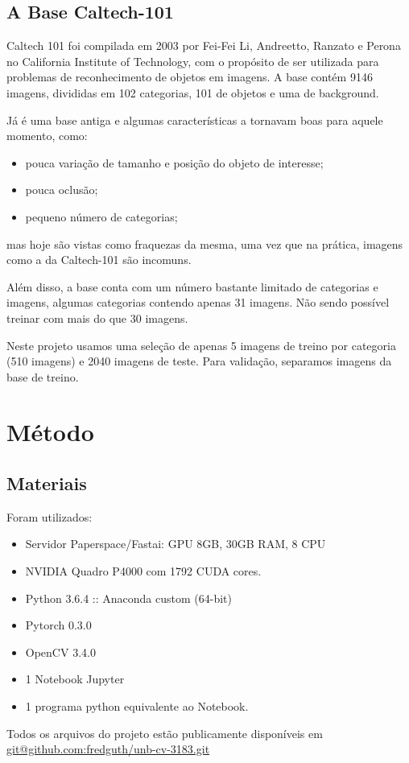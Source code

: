 \documentclass[conference]{IEEEtran}
\begin{document}
\subsection{A Base Caltech-101}
Caltech 101 foi compilada em 2003 por Fei-Fei Li, Andreetto, Ranzato e Perona no California Institute of Technology\cite{caltech101}, com o propósito de ser utilizada para problemas de reconhecimento de objetos em imagens. A base contém 9146 imagens, divididas em 102 categorias, 101 de objetos e uma de background. 

Já é uma base antiga e algumas características a tornavam boas para aquele momento, como:

\begin{itemize}
\item pouca variação de tamanho e posição do objeto de interesse;
\item pouca oclusão;
\item pequeno número de categorias;
\end{itemize}

mas hoje são vistas como fraquezas da mesma, uma vez que na prática, imagens como a da Caltech-101 são incomuns.

Além disso, a base conta com um número bastante limitado de categorias e imagens, algumas categorias contendo apenas 31 imagens. Não sendo possível treinar com mais do que 30 imagens.

Neste projeto usamos uma seleção de apenas 5 imagens de treino por categoria (510 imagens) e 2040 imagens de teste. Para validação, separamos imagens da base de treino.

\section{Método}\label{metodologia}

\subsection{Materiais}
Foram utilizados:
\begin{itemize}
\item Servidor Paperspace/Fastai: GPU 8GB, 30GB RAM, 8 CPU
\item NVIDIA Quadro P4000 com 1792 CUDA cores.
\item Python 3.6.4 :: Anaconda custom (64-bit)
\item Pytorch 0.3.0
\item OpenCV 3.4.0
\item 1 Notebook Jupyter
\item 1 programa python equivalente ao Notebook.
\end{itemize}
Todos os arquivos do projeto estão publicamente disponíveis em  \url{git@github.com:fredguth/unb-cv-3183.git}\label{repo}
\end{document}
